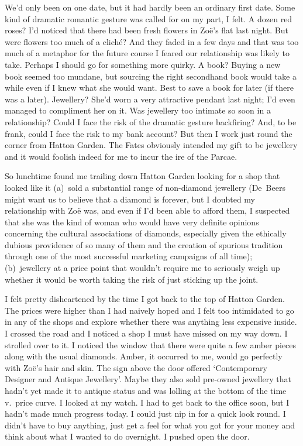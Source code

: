 We'd only been on one date, but it had hardly been an ordinary first
date. Some kind of dramatic romantic gesture was called for on my
part, I felt. A dozen red roses? I'd noticed that there had been
fresh flowers in Zoë's flat last night. But were flowers too
much of a cliché? And they faded in a few days and that was too
much of a metaphor for the future course I feared our relationship
was likely to take. Perhaps I should go for something more quirky. A
book? Buying a new book seemed too mundane, but sourcing the right
secondhand book would take a while even if I knew what she would
want. Best to save a book for later (if there was a later).
Jewellery? She'd worn a very attractive pendant last night; I'd even
managed to compliment her on it. Was jewellery too intimate so soon
in a relationship? Could I face the risk of the dramatic gesture
backfiring? And, to be frank, could I face the risk to my bank
account? But then I work just round the corner from Hatton Garden.
The Fates obviously intended my gift to be jewellery and it would
foolish indeed for me to incur the ire of the Parcae.

So lunchtime found me trailing down Hatton Garden looking for a shop
that looked like it (a)~sold a substantial range of non-diamond
jewellery (De~Beers might want us to believe that a diamond is
forever, but I doubted my relationship with Zoë was, and even if
I'd been able to afford them, I suspected that she was the kind of
woman who would have very definite opinions concerning the cultural
associations of diamonds, especially given the ethically dubious
providence of so many of them and the creation of spurious tradition
through one of the most successful marketing campaigns of all time);
(b)~jewellery at a price point that wouldn't require me to seriously
weigh up whether it would be worth taking the risk of just sticking
up the joint.

I felt pretty disheartened by the time I got back to the top of
Hatton Garden. The prices were higher than I had naively hoped and I
felt too intimidated to go in any of the shops and explore whether
there was anything less expensive inside. I crossed the road and I
noticed a shop I must have missed on my way down. I strolled over to
it. I noticed the window that there were quite a few amber pieces
along with the usual diamonds. Amber, it occurred to me, would go
perfectly with Zoë's hair and skin. The sign above the door
offered `Contemporary Designer and Antique Jewellery'. Maybe they
also sold pre-owned jewellery that hadn't yet made it to antique
status and was lolling at the bottom of the time v.~price curve. I
looked at my watch. I had to get back to the office soon, but I
hadn't made much progress today. I could just nip in for a quick
look round. I didn't have to buy anything, just get a feel for what
you got for your money and think about what I wanted to do
overnight. I pushed open the door.

